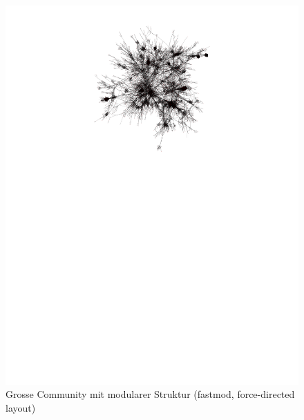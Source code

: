 \begin{figure}[h]
  \centering
  \includegraphics[scale=1.7]{images/fastmod-subgraph-large-modular-6525064ccab580a0b304a3620b197d7a.pdf}
  \caption{Grosse Community mit modularer Struktur (fastmod,
    force-directed layout)}
  \label{fig:large-community-modular}
\end{figure}
